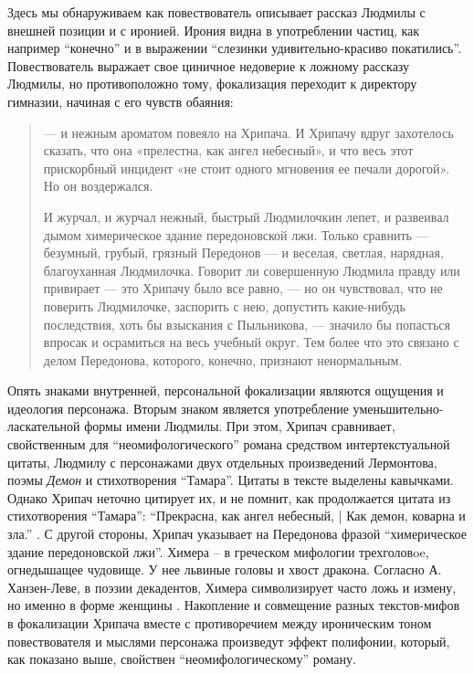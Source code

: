 \documentclass[12pt,a4paper]{article}
\begin{document}
Здесь мы обнаруживаем как повествователь описывает рассказ Людмилы с внешней позиции и с иронией. Ирония видна в употреблении частиц, как например \enquote{конечно} и в выражении \enquote{слезинки удивительно-красиво покатились}. Повествователь выражает свое циничное недоверие к ложному рассказу Людмилы, но противоположно тому, фокализация переходит к директору гимназии, начиная с его чувств обаяния:

\begin{quote}

— и нежным ароматом повеяло на Хрипача. И Хрипачу
вдруг захотелось сказать, что она «прелестна, как ангел небесный», и
что весь этот прискорбный инцидент «не стоит одного мгновения ее
печали дорогой». Но он воздержался.

И журчал, и журчал нежный, быстрый Людмилочкин лепет, и
развеивал дымом химерическое здание передоновской лжи. Только
сравнить — безумный, грубый, грязный Передонов — и веселая, светлая,
нарядная, благоуханная Людмилочка. Говорит ли совершенную
Людмила правду или привирает — это Хрипачу было все равно, — но он
чувствовал, что не поверить Людмилочке, заспорить с нею, допустить
какие-нибудь последствия, хоть бы взыскания с Пыльникова, — значило
бы попасться впросак и осрамиться на весь учебный округ. Тем более
что это связано с делом Передонова, которого, конечно, признают
ненормальным.

\parencite[240.]{sologub2004}
\end{quote}

Опять знаками внутренней, персональной фокализации являются ощущения и идеология персонажа. Вторым знаком является употребление уменьшительно-ласкательной формы имени Людмилы.  При этом, Хрипач сравнивает, свойственным для \enquote{неомифологического} романа средством интертекстуальной цитаты, Людмилу с персонажами двух отдельных произведений Лермонтова, поэмы \emph{Демон} и стихотворения \enquote{Тамара}. Цитаты в тексте выделены кавычками. Однако Хрипач неточно цитирует их, и не помнит, как продолжается цитата из стихотворения \enquote{Тамара}: \enquote{Прекрасна, как ангел небесный, | Как демон, коварна и зла.} \parencite[194]{lermontov2000}. С другой стороны, Хрипач указывает на Передонова фразой \enquote{химерическое здание передоновской лжи}. Химера – в греческом мифологии трехголовoe, огнедышащее чудовище. У нее львиные головы и хвост дракона. Согласно А. Ханзен-Леве, в поэзии декадентов, Химера символизирует часто ложь и измену, но именно в форме женщины \parencite[200]{hansen-love1999}. Накопление и совмещение разных текстов-мифов в фокализации Хрипача вместе с противоречием между ироническим тоном повествователя и мыслями персонажа произведут эффект полифонии, который, как показано выше, свойствен \enquote{неомифологическому} роману.
\end{document}
